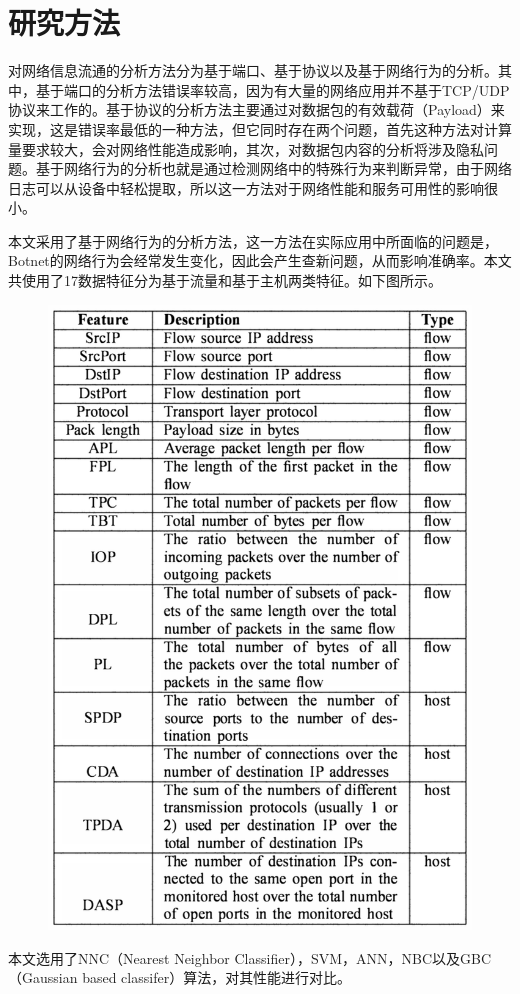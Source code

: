 \documentclass[a4papper]{article}
\begin{document}
  	\section{研究方法}
  	\par\setlength{\parindent}{2em} %
  	对网络信息流通的分析方法分为基于端口、基于协议以及基于网络行为的分析。其中，基于端口的分析方法错误率较高，因为有大量的网络应用并不基于TCP/UDP协议来工作的。基于协议的分析方法主要通过对数据包的有效载荷（Payload）来实现，这是错误率最低的一种方法，但它同时存在两个问题，首先这种方法对计算量要求较大，会对网络性能造成影响，其次，对数据包内容的分析将涉及隐私问题。基于网络行为的分析也就是通过检测网络中的特殊行为来判断异常，由于网络日志可以从设备中轻松提取，所以这一方法对于网络性能和服务可用性的影响很小。
  	 \par\setlength{\parindent}{2em} %
  	本文采用了基于网络行为的分析方法，这一方法在实际应用中所面临的问题是，Botnet的网络行为会经常发生变化，因此会产生查新问题，从而影响准确率。本文共使用了17数据特征分为基于流量和基于主机两类特征。如下图所示。\\
  	\begin{figure}[ht]
  		\centering
	  	\includegraphics[scale=.5]{table1.png}  	
  	\end{figure}
  	本文选用了NNC（Nearest Neighbor Classifier），SVM，ANN，NBC以及GBC（Gaussian based classifer）算法，对其性能进行对比。
\end{document}
